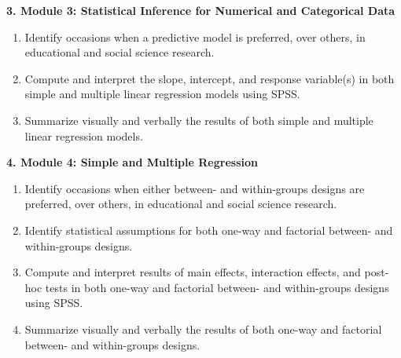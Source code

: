 \documentclass[
]{article}
\providecommand{\tightlist}{%
  \setlength{\itemsep}{0pt}\setlength{\parskip}{0pt}}
\begin{document}
\textbf{3. Module 3: Statistical Inference for Numerical and Categorical
Data}

\begin{enumerate}
\def\labelenumi{\arabic{enumi}.}
\tightlist
\item
  Identify occasions when a predictive model is preferred, over others,
  in educational and social science research.
\item
  Compute and interpret the slope, intercept, and response variable(s)
  in both simple and multiple linear regression models using SPSS.
\item
  Summarize visually and verbally the results of both simple and
  multiple linear regression models.
\end{enumerate}

\textbf{4. Module 4: Simple and Multiple Regression}

\begin{enumerate}
\def\labelenumi{\arabic{enumi}.}
\tightlist
\item
  Identify occasions when either between- and within-groups designs are
  preferred, over others, in educational and social science research.
\item
  Identify statistical assumptions for both one-way and factorial
  between- and within-groups designs.
\item
  Compute and interpret results of main effects, interaction effects,
  and post-hoc tests in both one-way and factorial between- and
  within-groups designs using SPSS.
\item
  Summarize visually and verbally the results of both one-way and
  factorial between- and within-groups designs.
\end{enumerate}
\end{document}

